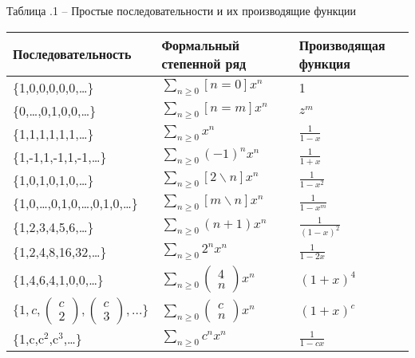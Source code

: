 \documentclass[
russian,
cp1251,
14pt,
simple
]{eskdtext}
\theoremstyle{definition}
\begin{document}
\newpage
\noindent Таблица \thesubsection.1 -- Простые последовательности и их производящие функции\\
\begin{tabular}{|p{2.5in}|p{2.0in}|p{2.0in}|} \hline 
Последовательность & Формальный степенной ряд & Производящая функция \\ \hline 
\{1,0,0,0,0,0,\dots \} & $\sum _{n\ge 0}[n=0]x^{n}  $ & 1 \\ \hline 
\{0,\dots ,0,1,0,0,\dots \} & $\sum\limits _{n\ge 0}[n=m]x^{n}  $ & $z^{m} $ \\ \hline 
\{1,1,1,1,1,1,\dots \} & $\sum\limits _{n\ge 0}x^{n}  $ & $\frac{1}{1-x} $ \\ \hline 
\{1,-1,1,-1,1,-1,\dots \} & $\sum\limits _{n\ge 0}(-1)^{n} x^{n}  $ & $\frac{1}{1+x} $ \\ \hline 
\{1,0,1,0,1,0,\dots \} & $\sum\limits _{n\ge 0}[2\backslash n]x^{n}  $ & $\frac{1}{1-x^{2} } $ \\ \hline 
\{1,0,\dots ,0,1,0,\dots ,0,1,0,\dots \} & $\sum\limits _{n\ge 0}[m\backslash n]x^{n}  $ & $\frac{1}{1-x^{m} } $ \\ \hline 
\{1,2,3,4,5,6,\dots \} & $\sum\limits _{n\ge 0}(n+1)x^{n}  $ & $\frac{1}{(1-x)^{2} } $ \\ \hline 
\{1,2,4,8,16,32,\dots \} & $\sum\limits _{n\ge 0}2^{n} x^{n}  $ & $\frac{1}{1-2x} $ \\ \hline 
\{1,4,6,4,1,0,0,\dots \} & $\sum\limits _{n\ge 0}\left(\begin{array}{c} {4} \\ {n} \end{array}\right)x^{n}  $ & $(1+x)^{4} $ \\ \hline 
$\{ 1,c,\left(\begin{array}{c} {c} \\ {2} \end{array}\right),\left(\begin{array}{c} {c} \\ {3} \end{array}\right),...\} $ & $\sum\limits _{n\ge 0}\left(\begin{array}{c} {c} \\ {n} \end{array}\right)x^{n}  $ & $(1+x)^{c} $ \\ \hline 
\{1,c,c${}^{2}$,c${}^{3}$,\dots \} & $\sum\limits _{n\ge 0}c^{n} x^{n}  $ & $\frac{1}{1-cx} $ \\ \hline 
\end{tabular}
\end{document}
